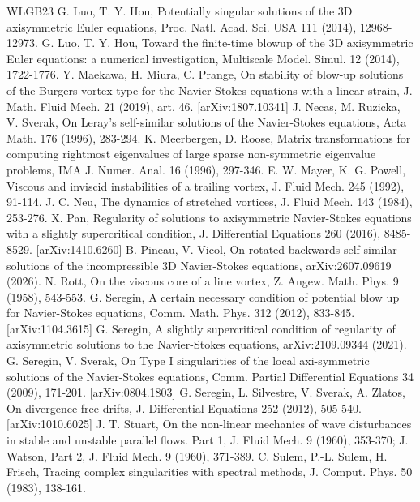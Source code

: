 \documentclass[11pt]{article}
\begin{document}
\begin{thebibliography}{WLGB23}
 G. Luo, T. Y. Hou, Potentially singular solutions of the 3D axisymmetric Euler equations, Proc. Natl. Acad. Sci. USA 111 (2014), 12968-12973.
 G. Luo, T. Y. Hou, Toward the finite-time blowup of the 3D axisymmetric Euler equations: a numerical investigation, Multiscale Model. Simul. 12 (2014), 1722-1776.
 Y. Maekawa, H. Miura, C. Prange, On stability of blow-up solutions of the Burgers vortex type for the Navier-Stokes equations with a linear strain, J. Math. Fluid Mech. 21 (2019), art. 46. [arXiv:1807.10341]
 J. Necas, M. Ruzicka, V. Sverak, On Leray's self-similar solutions of the Navier-Stokes equations, Acta Math. 176 (1996), 283-294.
 K. Meerbergen, D. Roose, Matrix transformations for computing rightmost eigenvalues of large sparse non-symmetric eigenvalue problems, IMA J. Numer. Anal. 16 (1996), 297-346.
 E. W. Mayer, K. G. Powell, Viscous and inviscid instabilities of a trailing vortex, J. Fluid Mech. 245 (1992), 91-114.
 J. C. Neu, The dynamics of stretched vortices, J. Fluid Mech. 143 (1984), 253-276.
 X. Pan, Regularity of solutions to axisymmetric Navier-Stokes equations with a slightly supercritical condition, J. Differential Equations 260 (2016), 8485-8529. [arXiv:1410.6260]
 B. Pineau, V. Vicol, On rotated backwards self-similar solutions of the incompressible 3D Navier-Stokes equations, arXiv:2607.09619 (2026).
 N. Rott, On the viscous core of a line vortex, Z. Angew. Math. Phys. 9 (1958), 543-553.
 G. Seregin, A certain necessary condition of potential blow up for Navier-Stokes equations, Comm. Math. Phys. 312 (2012), 833-845. [arXiv:1104.3615]
 G. Seregin, A slightly supercritical condition of regularity of axisymmetric solutions to the Navier-Stokes equations, arXiv:2109.09344 (2021).
 G. Seregin, V. Sverak, On Type I singularities of the local axi-symmetric solutions of the Navier-Stokes equations, Comm. Partial Differential Equations 34 (2009), 171-201. [arXiv:0804.1803]
 G. Seregin, L. Silvestre, V. Sverak, A. Zlatos, On divergence-free drifts, J. Differential Equations 252 (2012), 505-540. [arXiv:1010.6025]
 J. T. Stuart, On the non-linear mechanics of wave disturbances in stable and unstable parallel flows. Part 1, J. Fluid Mech. 9 (1960), 353-370; J. Watson, Part 2, J. Fluid Mech. 9 (1960), 371-389.
 C. Sulem, P.-L. Sulem, H. Frisch, Tracing complex singularities with spectral methods, J. Comput. Phys. 50 (1983), 138-161.

\end{thebibliography}
\end{document}
